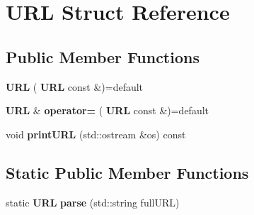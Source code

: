 \section{U\+RL Struct Reference}
\label{structURL}
\subsection*{Public Member Functions}
\begin{DoxyCompactItemize}
\item 
\mbox{\label{structURL_a76ac1d636021344f5b22b087b4a43384}} 
{\bfseries U\+RL} (\textbf{ U\+RL} const \&)=default
\item 
\mbox{\label{structURL_a2a0ec8eda362b934a2db62c5f8f0e5a5}} 
\textbf{ U\+RL} \& {\bfseries operator=} (\textbf{ U\+RL} const \&)=default
\item 
\mbox{\label{structURL_a3dd80d73054e220c0740811659927ee2}} 
void {\bfseries print\+U\+RL} (std\+::ostream \&os) const
\end{DoxyCompactItemize}
\subsection*{Static Public Member Functions}
\begin{DoxyCompactItemize}
\item 
\mbox{\label{structURL_ab884b2d58f61c00aa8f60d98b405e3ce}} 
static \textbf{ U\+RL} {\bfseries parse} (std\+::string full\+U\+RL)
\end{DoxyCompactItemize}
